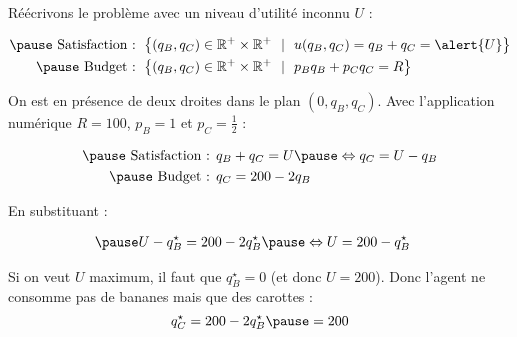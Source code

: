 \documentclass[9pt,professionalfonts,handout,hyperref]{beamer}
\begin{document}
\begin{frame}

Réécrivons le problème avec un niveau d'utilité inconnu $U$ :

	\[\begin{aligned}
\pause 	\text{ Satisfaction :   }&\left\{(q_B, q_C) \in \mathbb{R}^{+}\times\mathbb{R}^{+} ~~|~~u(q_B, q_C) = q_B + q_C = \alert{U} \right\} \\
\pause 	\text{ Budget :   }&\left\{(q_B, q_C) \in \mathbb{R}^{+}\times\mathbb{R}^{+} ~~|~~p_Bq_B + p_Cq_C=R\right\}
	\end{aligned}\]

	\bigskip

\pause 	On est en présence de deux droites dans le plan $(0,q_B,q_C)$. Avec l'application numérique $R =100$, $p_B= 1$ et $p_C = \frac{1}{2}$ :

	\[\begin{aligned}
\pause 	\text{ Satisfaction :   }&q_B + q_C = U \pause \Leftrightarrow q_C = U-q_B \\
\pause 	\text{ Budget :   }&q_C = 200-2q_B
	\end{aligned}\]

\pause  En substituant :

	\[\begin{aligned}
\pause 	&U-q_B^\star = 200-2q_B^\star \pause \Leftrightarrow U = 200-q_B^\star
	\end{aligned}\]

\pause Si on veut $U$ maximum, \pause il faut que $q_B^\star = 0$ \pause (et donc $U=200$). \pause Donc l'agent ne consomme pas de bananes \pause mais que des carottes : \pause $$q_C^\star = 200-2q_B^\star \pause = 200$$

\end{frame}
\end{document}
